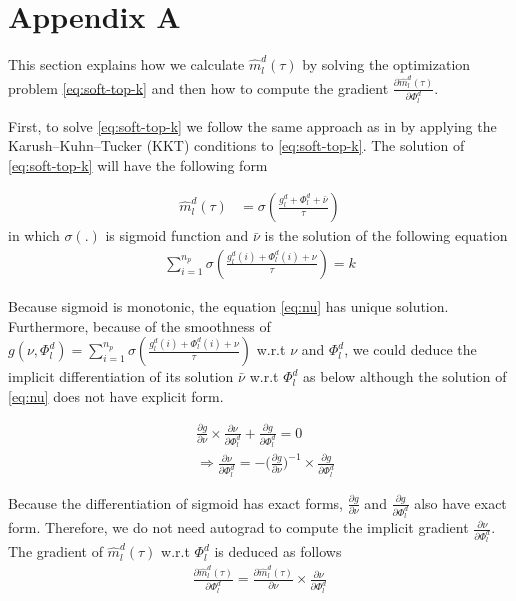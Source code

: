\documentclass[11pt]{article}
\begin{document}
\section{Appendix A}
\label{appendix:a}
This section explains how we calculate $\hat{m}_l^d(\tau)$ by solving the optimization problem \eqref{eq:soft-top-k} and then how to compute the gradient $\frac{\partial \hat{m}_l^d(\tau)}{\partial \Phi_l^d}$.

First, to solve \eqref{eq:soft-top-k} we follow the same approach as in \cite{amos19lml,amos20differential} by applying the Karush–Kuhn–Tucker (KKT) conditions to \eqref{eq:soft-top-k}. The solution of \eqref{eq:soft-top-k} will have the following form

\begin{align}
\hat{m}_l^d(\tau) &= \sigma(\frac{g_l^d + \Phi_l^d + \bar{\nu}}{\tau}) \label{eq:soft-m}
\end{align}
in which $\sigma(.)$ is sigmoid function and $\bar{\nu}$ is the solution of the following equation
\begin{align}
\displaystyle{\mathop{\sum}_{i=1}^{n_p}} \sigma(\frac{g_l^d(i) + \Phi_l^d(i) + \nu}{\tau}) = k \label{eq:nu}
\end{align}

Because sigmoid is monotonic, the equation \eqref{eq:nu} has unique solution. Furthermore,  because of the smoothness of $g(\nu,\Phi_l^d) = \displaystyle{\mathop{\sum}_{i=1}^{n_p}} \sigma(\frac{g_l^d(i) + \Phi_l^d(i) + \nu}{\tau})$ w.r.t $\nu$ and $\Phi_l^d$, we could deduce the implicit differentiation of its solution $\bar{\nu}$ w.r.t $\Phi_l^d$ as below although the solution of \eqref{eq:nu} does not have explicit form.

\begin{align*}
&\frac{\partial g}{\partial \nu} \times \frac{\partial \nu}{\partial \Phi_l^d} + \frac{\partial g}{\partial \Phi_l^d} = 0 \\
& \Rightarrow \frac{\partial \nu}{\partial \Phi_l^d} = - \big(\frac{\partial g}{\partial \nu}\big)^{-1} \times \frac{\partial g}{\partial \Phi_l^d}
\end{align*}

Because the differentiation of sigmoid has exact forms, $\frac{\partial g}{\partial \nu}$ and $\frac{\partial g}{\partial \Phi_l^d}$ also have exact form. Therefore, we do not need autograd to compute the implicit gradient $\frac{\partial \nu}{\partial \Phi_l^d}$. The gradient of $\hat{m}_l^d(\tau)$ w.r.t $\Phi_l^d$ is deduced as follows
\begin{align}
\frac{\partial \hat{m}_l^d(\tau)}{\partial \Phi_l^d} = \frac{\partial \hat{m}_l^d(\tau)}{\partial \nu} \times \frac{\partial \nu}{\partial \Phi_l^d}
\end{align}
\end{document}
